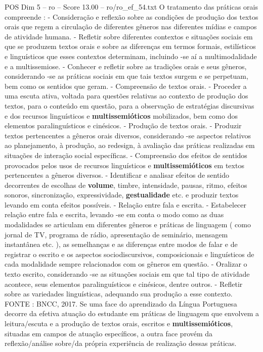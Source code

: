\begin{textsample}{POS Dim 5 – ro – Score 13.00 – ro/ro\_ef\_54.txt}
O tratamento das práticas orais compreende : - Consideração e reflexão sobre as condições de produção dos textos orais que regem a circulação de diferentes gêneros nas diferentes mídias e campos de atividade humana. - Refletir sobre diferentes contextos e situações sociais em que se produzem textos orais e sobre as diferenças em termos formais, estilísticos e linguísticos que esses contextos determinam, incluindo -se aí a multimodalidade e a multissemiose. - Conhecer e refletir sobre as tradições orais e seus gêneros, considerando -se as práticas sociais em que tais textos surgem e se perpetuam, bem como os sentidos que geram. - Compreensão de textos orais. - Proceder a uma escuta ativa, voltada para questões relativas ao contexto de produção dos textos, para o conteúdo em questão, para a observação de estratégias discursivas e dos recursos linguísticos e \textbf{multissemióticos} mobilizados, bem como dos elementos paralinguísticos e cinésicos. - Produção de textos orais. - Produzir textos pertencentes a gêneros orais diversos, considerando -se aspectos relativos ao planejamento, à produção, ao redesign, à avaliação das práticas realizadas em situações de interação social específicas. - Compreensão dos efeitos de sentidos provocados pelos usos de recursos linguísticos e \textbf{multissemióticos} em textos pertencentes a gêneros diversos. - Identificar e analisar efeitos de sentido decorrentes de escolhas de \textbf{volume}, timbre, intensidade, pausas, ritmo, efeitos sonoros, sincronização, expressividade, \textbf{gestualidade} etc. e produzir textos levando em conta efeitos possíveis. - Relação entre fala e escrita. - Estabelecer relação entre fala e escrita, levando -se em conta o modo como as duas modalidades se articulam em diferentes gêneros e práticas de linguagem ( como jornal de TV, programa de rádio, apresentação de seminário, mensagem instantânea etc. ), as semelhanças e as diferenças entre modos de falar e de registrar o escrito e os aspectos sociodiscursivos, composicionais e linguísticos de cada modalidade sempre relacionados com os gêneros em questão. - Oralizar o texto escrito, considerando -se as situações sociais em que tal tipo de atividade acontece, seus elementos paralinguísticos e cinésicos, dentre outros. - Refletir sobre as variedades linguísticas, adequando sua produção a esse contexto.
FONTE : BNCC, 2017.
Se uma face do aprendizado da Língua Portuguesa decorre da efetiva atuação do estudante em práticas de linguagem que envolvem a leitura/escuta e a produção de textos orais, escritos e \textbf{multissemióticos}, situadas em campos de atuação específicos, a outra face provém da reflexão/análise sobre/da própria experiência de realização dessas práticas.

\end{textsample}
